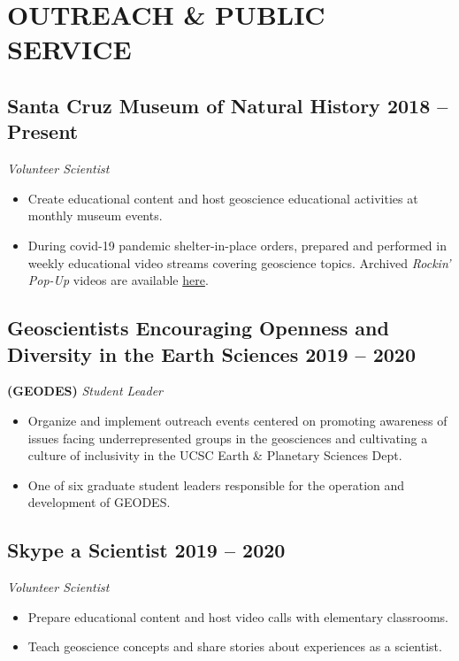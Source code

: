\documentclass[10pt]{article}
\begin{document}
\section*{OUTREACH \& PUBLIC SERVICE}

\subsection*{\textbf{Santa Cruz Museum of Natural History} \hfill 2018 – Present}
\textit{Volunteer Scientist}
\begin{itemize}
	\item Create educational content and host geoscience educational activities at monthly museum events.
	\item During covid-19 pandemic shelter-in-place orders, prepared and performed in weekly educational video streams covering geoscience topics. Archived \emph{Rockin' Pop-Up} videos are available \href{https://www.santacruzmuseum.org/category/rockin-pop-up/}{here}.
\end{itemize}

\subsection*{\textbf{Geoscientists Encouraging Openness and Diversity in the Earth Sciences} \hfill 2019 – 2020}
\textbf{(GEODES)} \hspace{3pt} \textit{Student Leader}
\begin{itemize}
	\item Organize and implement outreach events centered on promoting awareness of issues facing underrepresented groups in the geosciences and cultivating a culture of inclusivity in the UCSC Earth \& Planetary Sciences Dept.
	\item One of six graduate student leaders responsible for the operation and development of GEODES.
\end{itemize}

\subsection*{\textbf{Skype a Scientist} \hfill 2019 – 2020}
\textit{Volunteer Scientist}
\begin{itemize}
	\item Prepare educational content and host video calls with elementary classrooms.
	\item Teach geoscience concepts and share stories about experiences as a scientist.
\end{itemize}
\end{document}
